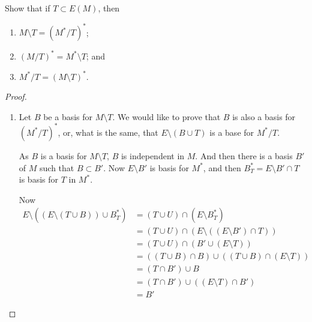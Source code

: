 \prob
{   \label{p14}
	Show that if $T \subset E(M)$, then\pn
	\begin{enumerate}[label=(\roman*)]
		\item $M \setminus T = (M^* / T)^*$;
		\item $(M / T)^* = M^* \setminus T$; and
		\item $M^* / T = (M \setminus T)^*$.
	\end{enumerate}
}
\begin{proof}
    \begin{enumerate}[label=(\roman*)]
        \item 
            Let $B$ be a basis for $M \setminus T$. We would like to prove that
            $B$ is also a basis for $(M^* / T)^*$, or, what is the same, 
            that $E \setminus (B \cup T)$ is a base for $M^* / T$.\pn
            
            As $B$ is a basis for $M \setminus T$, $B$ is independent in $M$. And then
            there is a basis $B'$ of $M$ such that $B \subset B'$. Now $E \setminus B'$
            is basis for $M^*$, and then $B^*_T = E \setminus B' \cap T$ is basis for $T$ in
            $M^*$.
            
            Now
            \begin{align}
                E \setminus ((E \setminus (T \cup B)) \cup B^*_T)   &=  (T \cup U) \cap (E \setminus B^*_T)                                 \\
                                                                    &=  (T \cup U) \cap (E \setminus ((E\setminus B') \cap T))              \\
                                                                    &=  (T \cup U) \cap (B'\cup (E \setminus T))                            \\
                                                                    &=  ((T \cup B) \cap B) \cup ((T \cup B) \cap( E\setminus T))           \\
                                                                    &=  (T \cap B') \cup B                                                  \\
                                                                    &=  (T \cap B') \cup ((E \setminus T) \cap B')                          \\
                                                                    &=  B'
            \end{align}
            

\end{enumerate}
\end{proof}
